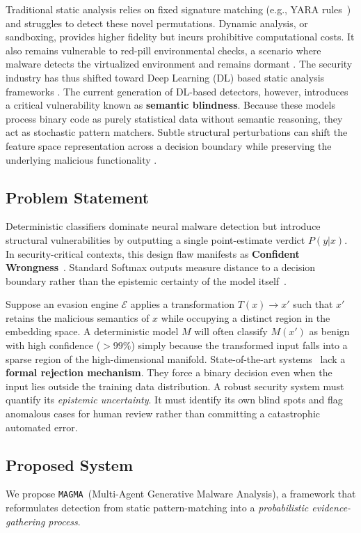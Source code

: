 \documentclass[pdflatex,sn-mathphys-num]{sn-jnl}
\newcommand{\sysname}{\texttt{MAGMA}~}
\begin{document}
Traditional static analysis relies on fixed signature matching (e.g., YARA rules~\cite{Li2023PackGenome}) and struggles to detect these novel permutations. Dynamic analysis, or sandboxing, provides higher fidelity but incurs prohibitive computational costs. It also remains vulnerable to red-pill environmental checks, a scenario where malware detects the virtualized environment and remains dormant \cite{Bulazel_Alexei2017Survey}. The security industry has thus shifted toward Deep Learning (DL) based static analysis frameworks \cite{GibertDaniel2020Rise}. The current generation of DL-based detectors, however, introduces a critical vulnerability known as \textbf{semantic blindness}. Because these models process binary code as purely statistical data without semantic reasoning, they act as stochastic pattern matchers. Subtle structural perturbations can shift the feature space representation across a decision boundary while preserving the underlying malicious functionality \cite{Arp_Daniel2022Dos}.

\subsection{Problem Statement}
\label{sec:intro_limitations}
Deterministic classifiers dominate neural malware detection but introduce structural vulnerabilities by outputting a single point-estimate verdict $P(y|x)$. In security-critical contexts, this design flaw manifests as \textbf{Confident Wrongness}~\cite{Hein_Matthias2019Why}. Standard Softmax outputs measure distance to a decision boundary rather than the epistemic certainty of the model itself~\cite{Gal_Yarin2016Dropout}.

Suppose an evasion engine $\mathcal{E}$ applies a transformation $T(x) \to x'$ such that $x'$ retains the malicious semantics of $x$ while occupying a distinct region in the embedding space. A deterministic model $M$ will often classify $M(x')$ as benign with high confidence ($>99\%$) simply because the transformed input falls into a sparse region of the high-dimensional manifold. State-of-the-art systems~\cite{HeYuewang2024ResNeXt} lack a \textbf{formal rejection mechanism}. They force a binary decision even when the input lies outside the training data distribution. A robust security system must quantify its \textit{epistemic uncertainty}. It must identify its own blind spots and flag anomalous cases for human review rather than committing a catastrophic automated error.

\subsection{Proposed System}
\label{sec:intro_system}
We propose \sysname (Multi-Agent Generative Malware Analysis), a framework that reformulates detection from static pattern-matching into a \textit{probabilistic evidence-gathering process}.
\end{document}

